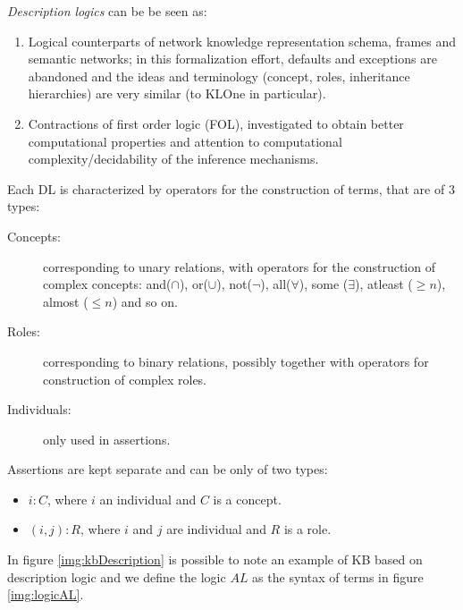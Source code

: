 \emph{Description logics} can be be seen as:
\begin{enumerate}
   \item Logical counterparts of network knowledge representation schema, frames
         and semantic networks; in this formalization effort, defaults and exceptions
	 are abandoned and the ideas and terminology (concept, roles, inheritance
	 hierarchies) are very similar (to KLOne in particular).
   \item Contractions of first order logic (FOL), investigated to obtain better
         computational properties and attention to computational complexity/decidability
	 of the inference mechanisms.
\end{enumerate}
Each DL is characterized by operators for the construction of terms, that are of $3$ types:
\begin{description}
    \item [Concepts: ] corresponding to unary relations, with operators for the construction
	   of complex concepts: and($\cap$), or($\cup$), not($\neg$), all($\forall$), 
	   some ($\exists$), atleast ($\geq n$), almost ($\leq n$) and so on.
    \item [Roles: ] corresponding to binary relations, possibly together with operators
	            for construction of complex roles.
    \item [Individuals:]  only used in assertions.
\end{description}
Assertions are kept separate and can be only of two types:
\begin{itemize}
   \item $i: C$, where $i$ an individual and $C$ is a concept.
   \item $(i, j): R$, where $i$ and $j$ are individual and $R$ is a role.
\end{itemize}
In figure \ref{img:kbDescription} is possible to note an example of KB based on 
description logic and we define the logic $AL$ as the syntax of terms 
in figure \ref{img:logicAL}.

